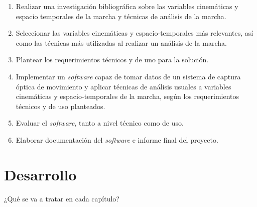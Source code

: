 \begin{enumerate}
    \item Realizar una investigación bibliográfica sobre las variables cinemáticas y espacio temporales de la marcha y técnicas de análisis de la marcha.
    \item Seleccionar las variables cinemáticas y espacio-temporales más relevantes, así como las técnicas más utilizadas al realizar un análisis de la marcha. 
    \item Plantear los requerimientos técnicos y de uno para la solución. 
    \item Implementar un \emph{software} capaz de tomar datos de un sistema de captura óptica de movimiento y aplicar técnicas de análisis usuales a variables cinemáticas y espacio-temporales de la marcha, según los requerimientos técnicos y de uso planteados.
    \item Evaluar el \emph{software}, tanto a nivel técnico como de uso.
    \item Elaborar documentación del \emph{software} e informe final del proyecto.
\end{enumerate}

\section{Desarrollo}

¿Qué se va a tratar en cada capítulo? 
